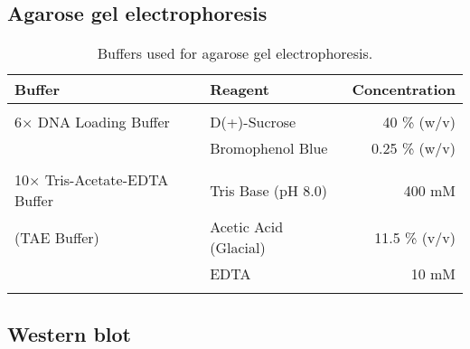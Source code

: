 \subsection{Agarose gel electrophoresis}

\begin{table}[H]
\begin{tabular}{l l r}
\textbf{Buffer} & \textbf{Reagent} & \textbf{Concentration}\\
\hline
\\
6$\times$ DNA Loading Buffer & D(+)-Sucrose & 40 \% (w/v) \\
& Bromophenol Blue & 0.25 \% (w/v)\\
\\
10$\times$ Tris-Acetate-EDTA Buffer & Tris Base (pH 8.0) & 400 mM \\
(TAE Buffer) & Acetic Acid (Glacial) & 11.5 \% (v/v) \\
& EDTA & 10 mM \\
\\
\end{tabular}
\caption[Agarose gel electrophoresis buffers]{Buffers used for agarose gel electrophoresis.}
\label{Gel electrophoresis}
\end{table}


\subsection{Western blot}

